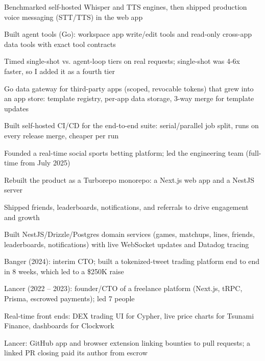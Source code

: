 \documentclass[print]{jack-resume}
\begin{document}
\begin{tightemize}
    \item Benchmarked self-hosted Whisper and TTS engines, then shipped production voice messaging (STT/TTS) in the web app
    \item Built agent tools (Go): workspace app write/edit tools and read-only cross-app data tools with exact tool contracts
    \item Timed single-shot vs. agent-loop tiers on real requests; single-shot was 4-6x faster, so I added it as a fourth tier
    \item Go data gateway for third-party apps (scoped, revocable tokens) that grew into an app store: template registry, per-app data storage, 3-way merge for template updates
    \item Built self-hosted CI/CD for the end-to-end suite: serial/parallel job split, runs on every release merge, cheaper per run
\end{tightemize}
\sectionsep

\begin{tightemize}
    \item Founded a real-time social sports betting platform; led the engineering team (full-time from July 2025)
    \item Rebuilt the product as a Turborepo monorepo: a Next.js web app and a NestJS server
    \item Shipped friends, leaderboards, notifications, and referrals to drive engagement and growth
    \item Built NestJS/Drizzle/Postgres domain services (games, matchups, lines, friends, leaderboards, notifications) with live WebSocket updates and Datadog tracing
\end{tightemize}
\sectionsep

\begin{tightemize}
    \item Banger (2024): interim CTO; built a tokenized-tweet trading platform end to end in 8 weeks, which led to a \$250K raise
    \item Lancer (2022 -- 2023): founder/CTO of a freelance platform (Next.js, tRPC, Prisma, escrowed payments); led 7 people
    \item Real-time front ends: DEX trading UI for Cypher, live price charts for Tsunami Finance, dashboards for Clockwork
    \item Lancer: GitHub app and browser extension linking bounties to pull requests; a linked PR closing paid its author from escrow
\end{tightemize}
\sectionsep
\end{document}
